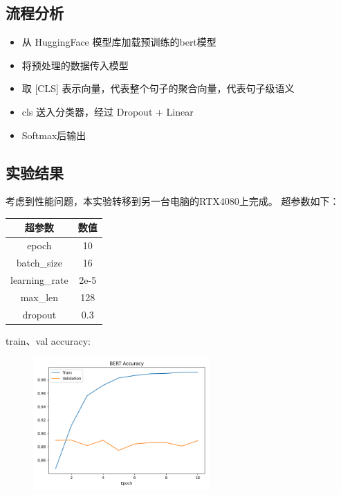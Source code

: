 \documentclass{article}
\begin{document}
\FloatBarrier



\subsection{流程分析}

\begin{itemize}
    \item 从 HuggingFace 模型库加载预训练的bert模型
    \item 将预处理的数据传入模型
    \item 取 [CLS] 表示向量，代表整个句子的聚合向量，代表句子级语义
    \item cls 送入分类器，经过 Dropout + Linear
    \item Softmax后输出
\end{itemize}

\subsection{实验结果}
考虑到性能问题，本实验转移到另一台电脑的RTX4080上完成。
超参数如下：

\begin{table}[H]  
    \centering        
    \begin{tabular}{|c|c|}
    \hline
    {\bf 超参数} & {\bf 数值} \\
    \hline
    epoch & 10  \\
    \hline
    batch\_size & 16  \\
    \hline
    learning\_rate & 2e-5 \\
    \hline
    max\_len & 128 \\
    \hline
    dropout & 0.3 \\
    \hline 
    \end{tabular}
\end{table}

train、val accuracy:
\begin{figure}[h]
    \centering
    \includegraphics[width=0.6\textwidth]{../results/bert_acc.png}
\end{figure}
\end{document}
